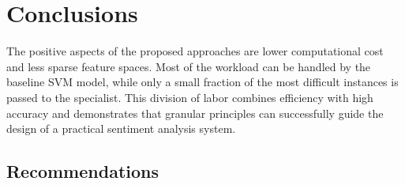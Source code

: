 \documentclass[a4paper,twoside,12pt]{book}
\begin{document}
\section{Conclusions}

The positive aspects of the proposed approaches are lower computational cost and less sparse feature spaces. Most of the workload can be handled by the baseline SVM model, while only a small fraction of the most difficult instances is passed to the specialist. This division of labor combines efficiency with high accuracy and demonstrates that granular principles can successfully guide the design of a practical sentiment analysis system.

\subsection{Recommendations}
\end{document}

